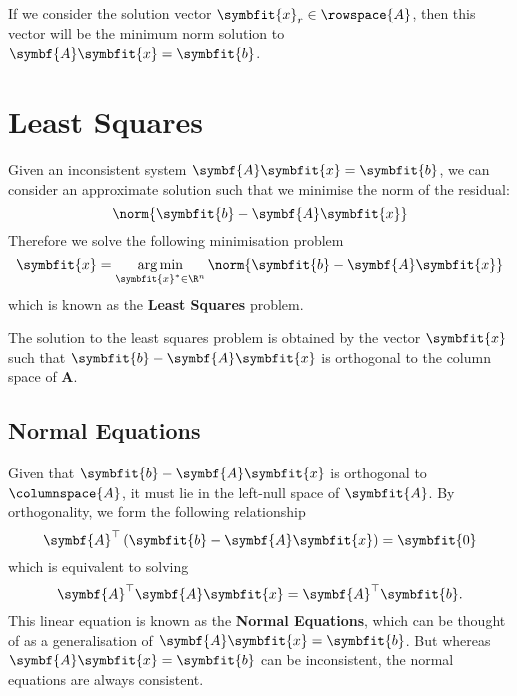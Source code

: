 \documentclass{article}
\DeclareMathOperator*{\argmin}{arg\,min}
\begin{document}
If we consider the solution vector \(\symbfit{x}_r \in \rowspace{A}\), then this vector
will be the minimum norm solution to \(\symbf{A}\symbfit{x} = \symbfit{b}\).
\section{Least Squares}
Given an inconsistent system \(\symbf{A}\symbfit{x} = \symbfit{b}\), we can consider an approximate solution such that we
minimise the norm of the residual:
\begin{equation*}
    \norm{\symbfit{b} - \symbf{A}\symbfit{x}}
\end{equation*}
Therefore we solve the following minimisation problem 
\begin{equation*}
    \symbfit{x} = \argmin_{\symbfit{x}^\ast \in \R^n} \norm{\symbfit{b} - \symbf{A}\symbfit{x}}
\end{equation*}
which is known as the \textbf{Least Squares} problem.
\begin{theorem}
    The solution to the least squares problem is obtained by the vector \(\symbfit{x}\) such 
    that \(\symbfit{b} - \symbf{A}\symbfit{x}\) is orthogonal to the column space of \(\symbf{A}\).
\end{theorem}
\subsection{Normal Equations}
Given that \(\symbfit{b} - \symbf{A}\symbfit{x}\) is orthogonal to \(\columnspace{A}\), it must lie in the
left-null space of \(\symbfit{A}\). By orthogonality, we form the following relationship
\begin{equation*}
    \symbf{A}^\top \left( \symbfit{b} - \symbf{A}\symbfit{x} \right) = \symbfit{0}
\end{equation*}
which is equivalent to solving
\begin{equation*}
    \symbf{A}^\top \symbf{A}\symbfit{x} = \symbf{A}^\top \symbfit{b}.
\end{equation*}
This linear equation is known as the \textbf{Normal Equations}, which can be thought of as
a \linebreak generalisation of \(\symbf{A}\symbfit{x} = \symbfit{b}\). But whereas \(\symbf{A}\symbfit{x} = \symbfit{b}\)
can be inconsistent, the normal equations are always consistent.
\end{document}
